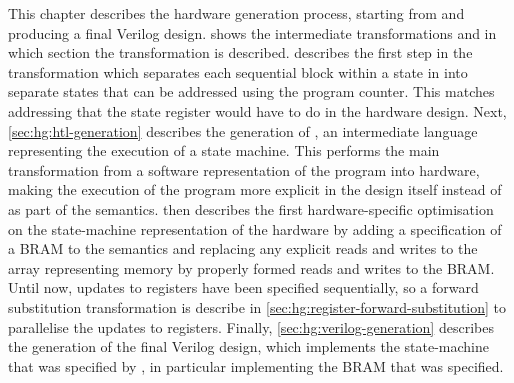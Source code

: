 This chapter describes the hardware generation process, starting from \rtlpar{}
and producing a final Verilog design.
 shows the intermediate
transformations and in which section the transformation is described.
 describes the first step in the
transformation which separates each sequential block within a state in \rtlpar{}
into separate states that can be addressed using the program counter.  This
matches addressing that the state register would have to do in the hardware
design. Next, \cref{sec:hg:htl-generation} describes the generation of \htl{},
an intermediate language representing the execution of a state machine.  This
performs the main transformation from a software representation of the program
into hardware, making the execution of the program more explicit in the design
itself instead of as part of the semantics.   then
describes the first hardware-specific optimisation on the state-machine
representation of the hardware by adding a specification of a \gls{BRAM} to the
\htl{} semantics and replacing any explicit reads and writes to the array
representing memory by properly formed reads and writes to the \gls{BRAM}.
Until now, updates to registers have been specified sequentially, so a forward
substitution transformation is describe in
\cref{sec:hg:register-forward-substitution} to parallelise the updates to
registers.  Finally, \cref{sec:hg:verilog-generation} describes the generation
of the final Verilog design, which implements the state-machine that was
specified by \htl{}, in particular implementing the \gls{BRAM} that was
specified.

